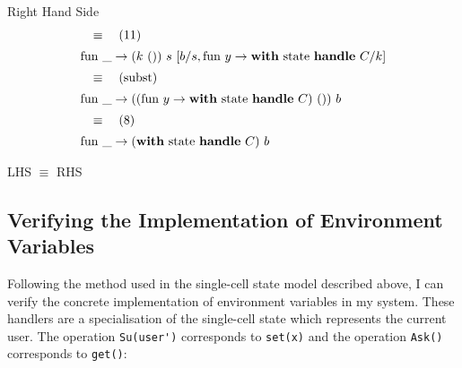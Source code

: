 \documentclass[logo,bsc,singlespacing,parskip]{infthesis}
\begin{document}
{Right Hand Side}
\[ 
\begin{array}{l}
\quad\equiv\quad (11) \\[5pt]
\text{fun }\_ \rightarrow (k\ ())\ s\ [b/s, \text{fun } y \rightarrow \text{\textbf{with} state \textbf{handle} } C/k] \\[5pt]
\quad\equiv\quad (\text{subst}) \\[5pt]
\text{fun }\_ \rightarrow ((\text{fun } y \rightarrow \text{\textbf{with} state \textbf{handle} } C)\ ())\ b \\[5pt]
\quad\equiv\quad (8) \\[5pt]
\text{fun }\_ \rightarrow (\text{\textbf{with} state \textbf{handle} } C)\ b
\end{array}
\]

LHS $\equiv$ RHS



\subsection{Verifying the Implementation of Environment Variables}
Following the method used in the single-cell state model described above, I can verify the concrete implementation of environment variables in my system. These handlers are a specialisation of the single-cell state which represents the current user. The operation \lstinline{Su(user')} corresponds to \lstinline{set(x)} and the operation \lstinline{Ask()} corresponds to \lstinline{get()}:
\end{document}
